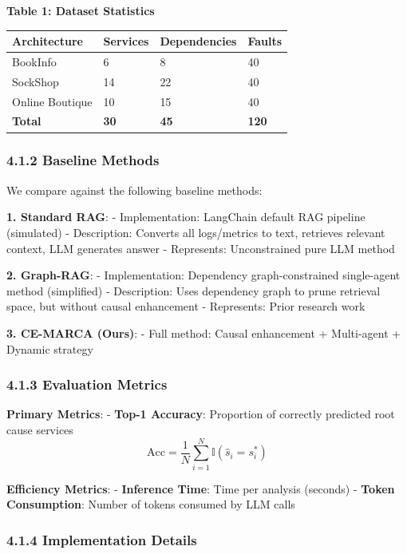 \textbf{Table 1: Dataset Statistics}

\begin{longtable}[]{@{}llll@{}}
\toprule
Architecture & Services & Dependencies & Faults\tabularnewline
\midrule
\endhead
BookInfo & 6 & 8 & 40\tabularnewline
SockShop & 14 & 22 & 40\tabularnewline
Online Boutique & 10 & 15 & 40\tabularnewline
\textbf{Total} & \textbf{30} & \textbf{45} & \textbf{120}\tabularnewline
\bottomrule
\end{longtable}

\hypertarget{baseline-methods}{%
\subsubsection{4.1.2 Baseline Methods}\label{baseline-methods}}

We compare against the following baseline methods:

\textbf{1. Standard RAG}: - Implementation: LangChain default RAG
pipeline (simulated) - Description: Converts all logs/metrics to text,
retrieves relevant context, LLM generates answer - Represents:
Unconstrained pure LLM method

\textbf{2. Graph-RAG}: - Implementation: Dependency graph-constrained
single-agent method (simplified) - Description: Uses dependency graph to
prune retrieval space, but without causal enhancement - Represents:
Prior research work

\textbf{3. CE-MARCA (Ours)}: - Full method: Causal enhancement +
Multi-agent + Dynamic strategy

\hypertarget{evaluation-metrics}{%
\subsubsection{4.1.3 Evaluation Metrics}\label{evaluation-metrics}}

\textbf{Primary Metrics}: - \textbf{Top-1 Accuracy}: Proportion of
correctly predicted root cause services
\[\text{Acc} = \frac{1}{N}\sum_{i=1}^{N} \mathbb{I}(\hat{s}_i = s_i^*)\]

\textbf{Efficiency Metrics}: - \textbf{Inference Time}: Time per
analysis (seconds) - \textbf{Token Consumption}: Number of tokens
consumed by LLM calls

\hypertarget{implementation-details}{%
\subsubsection{4.1.4 Implementation
Details}\label{implementation-details}}

